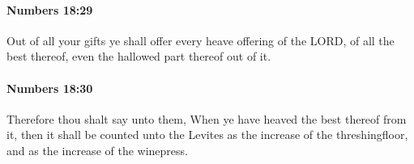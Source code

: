 		\paragraph{Numbers 18:29} %
			\label{NUMBERS-18-29}

			Out of all your gifts ye shall offer every heave offering of the LORD, of all the best thereof, even the hallowed part thereof out of it.


		\paragraph{Numbers 18:30} %
			\label{NUMBERS-18-30}

			Therefore thou shalt say unto them, When ye have heaved the best thereof from it, then it shall be counted unto the Levites as the increase of the threshingfloor, and as the increase of the winepress.


